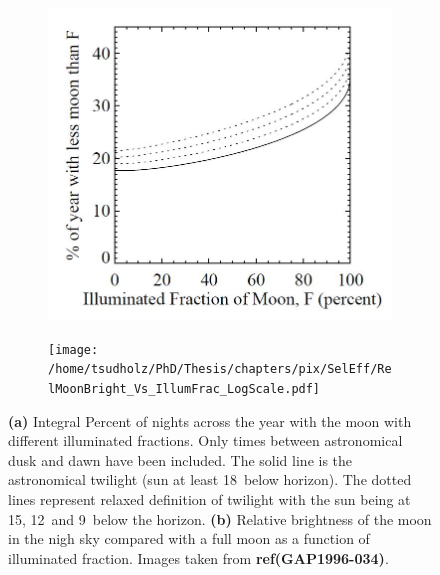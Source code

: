 \begin{figure}
\centering
\begin{subfigure}[b]{0.32\textwidth}
\includegraphics[width=\textwidth]{chapters/pix/SelEff/IlluminatedMoonFrac_Twilight.JPG}
\caption{}\label{fig:MoonYearlyFrac}
\end{subfigure}
\hspace*{3mm}
\begin{subfigure}[b]{0.555\textwidth}
\texttt{[image: /home/tsudholz/PhD/Thesis/chapters/pix/SelEff/RelMoonBright\_Vs\_IllumFrac\_LogScale.pdf]}
\caption{}\label{fig:MoonIllumFrac}
\end{subfigure}
\caption{\textbf{(a)} Integral Percent of nights across the year with the moon with different illuminated fractions. Only times between astronomical dusk and dawn have been included. The solid line is the astronomical twilight (sun at least 18\textdegree \ below horizon). The dotted lines represent relaxed definition of twilight with the sun being at 15\textdegree , 12\textdegree \ and 9\textdegree \ below the horizon. \textbf{(b)} Relative brightness of the moon in the nigh sky compared with a full moon as a function of illuminated fraction. Images taken from \textbf{ref{(GAP1996-034)}}. } 
\end{figure}

